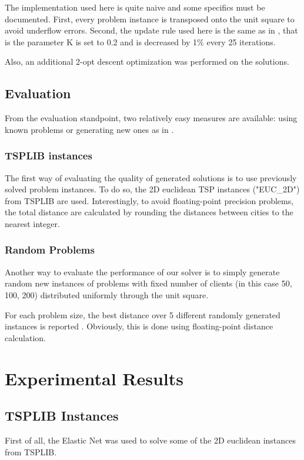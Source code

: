 \documentclass{article} %
\begin{document}
The implementation used here is quite naive and some specifics must be documented. First, every problem instance is transposed onto the unit square to avoid underflow errors. Second, the update rule used here is the same as in \citep{en_original}, that is the parameter K is set to 0.2 and is decreased by 1\% every 25 iterations.

Also, an additional 2-opt descent optimization was performed on the solutions.


\subsection{Evaluation}

From the evaluation standpoint, two relatively easy measures are available: using known problems or generating new ones as in \citep{en_original}.


\subsubsection{TSPLIB instances}

The first way of evaluating the quality of generated solutions is to use previously solved problem instances. To do so, the 2D euclidean TSP instances ("EUC\_2D") from TSPLIB \citep{tsplib} are used. Interestingly, to avoid floating-point precision problems, the total distance are calculated by rounding the distances between cities to the nearest integer.


\subsubsection{Random Problems}
Another way to evaluate the performance of our solver is to simply generate random new instances of problems with fixed number of clients (in this case 50, 100, 200) distributed uniformly through the unit square.

For each problem size, the best distance over 5 different randomly generated instances is reported \citep{en_original}. Obviously, this is done using floating-point distance calculation.




\newpage
\section{Experimental Results}
\label{results}


\subsection{TSPLIB Instances}
First of all, the Elastic Net was used to solve some of the 2D euclidean instances from TSPLIB.
\end{document}
